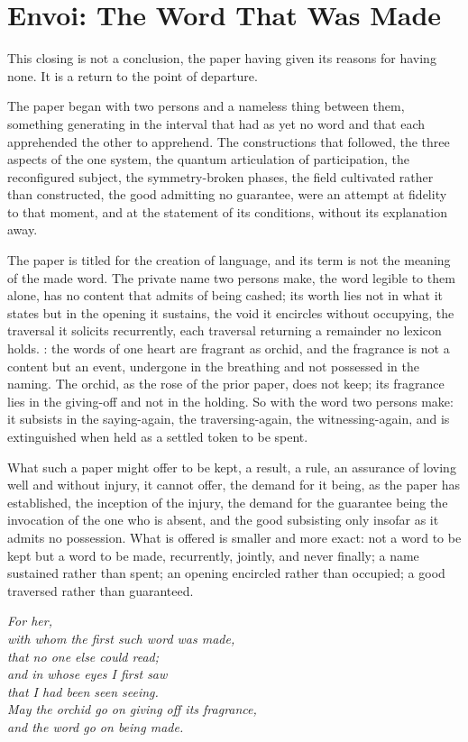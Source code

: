 \section*{Envoi: The Word That Was Made}
\label{p10:sec:envoi}

\noindent
This closing is not a conclusion, the paper having given its reasons for having none. It is a return to the point of departure.

The paper began with two persons and a nameless thing between them, something generating in the interval that had as yet no word and that each apprehended the other to apprehend. The constructions that followed, the three aspects of the one system, the quantum articulation of participation, the reconfigured subject, the symmetry-broken phases, the field cultivated rather than constructed, the good admitting no guarantee, were an attempt at fidelity to that moment, and at the statement of its conditions, without its explanation away.

The paper is titled for the creation of language, and its term is not the meaning of the made word. The private name two persons make, the word legible to them alone, has no content that admits of being cashed; its worth lies not in what it states but in the opening it sustains, the void it encircles without occupying, the traversal it solicits recurrently, each traversal returning a remainder no lexicon holds. : the words of one heart are fragrant as orchid, and the fragrance is not a content but an event, undergone in the breathing and not possessed in the naming. The orchid, as the rose of the prior paper, does not keep; its fragrance lies in the giving-off and not in the holding. So with the word two persons make: it subsists in the saying-again, the traversing-again, the witnessing-again, and is extinguished when held as a settled token to be spent.

What such a paper might offer to be kept, a result, a rule, an assurance of loving well and without injury, it cannot offer, the demand for it being, as the paper has established, the inception of the injury, the demand for the guarantee being the invocation of the one who is absent, and the good subsisting only insofar as it admits no possession. What is offered is smaller and more exact: not a word to be kept but a word to be made, recurrently, jointly, and never finally; a name sustained rather than spent; an opening encircled rather than occupied; a good traversed rather than guaranteed.

\begin{flushright}
\itshape\color{rose}
For her, \\
with whom the first such word was made,\\
that no one else could read;\\
and in whose eyes I first saw\\
that I had been seen seeing.\\[0.6em]
\upshape\footnotesize\color{gold}
May the orchid go on giving off its fragrance,\\
and the word go on being made.
\end{flushright}
